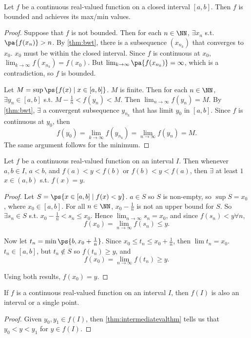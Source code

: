 \documentclass[11pt]{scrartcl}
\numberwithin{equation}{section}
\begin{document}
\begin{theorem}
    Let $f$ be a continuous real-valued function on a closed interval 
    $[a,b]$. Then $f$ is bounded and achieves its max/min values.
\end{theorem}
\begin{proof}
    Suppose that $f$ is not bounded. Then for each $n\in \NN$, 
    $\exists x_n$ s.t. $\pa{f(x_n)}>n$. By \cref{thm:bwt},
    there is a subsequence $(x_{n_k})$ that converges to $x_0$.
    $x_0$ must be within the closed interval. Since $f$ is continuous at 
    $x_0$, $\lim_{k\rightarrow \infty}f(x_{n_k}) =f(x_0)$.
    But $\lim_{k\rightarrow \infty}\pa{f(x_{n_k})} = \infty$,
    which is a contradiction, so $f$ is bounded.
    
    Let $M = \sup\ps{f(x)\mid x\in[a,b]}$. $M$ is finite.
    Then for each $n\in \NN$, $\exists y_n\in[a,b]$ s.t. $M-\frac{1}{n}<f(y_n) < M$. Then $\lim_{n\rightarrow \infty}f(y_n) = M$.
    By \cref{thm:bwt}, $\exists$ a convergent subsequence $y_{n_k}$
    that has limit $y_0$ in $[a,b]$. 
    Since $f$ is continuous at $y_0$, then 
    \[ f(y_0) = \lim_{k\rightarrow \infty}f(y_{n_k}) = \lim_{n\rightarrow \infty}f(y_n) = M. \]
    The same argument follows for the minimum.
\end{proof}
\begin{theorem}
    \label{thm:intermediatevalthm}
    Let $f$ be a continuous real-valued function on an interval $I$.
    Then whenever $a,b\in I$, $a<b$, and $f(a) < y < f(b)$ or 
    $f(b) < y < f(a)$, then $\exists$ at least $1$ $x\in(a,b)$ s.t.
    $f(x) = y$.
\end{theorem}
\begin{proof}
    Let $S = \ps{x\in [a,b] \mid f(x)<y}$.
    $a\in S$ so $S$ is non-empty, so $\sup S = x_0$, where $x_0 \in [a,b]$.
    For all $n\in \NN$, $x_0-\frac{1}{n}$ is not an upper bound for $S$.
    So $\exists s_n\in S$ s.t. $x_0-\frac{1}{n}<s_n\leq x_0$. Hence 
    $\lim_{n\rightarrow \infty}s_n=x_0$, and since $f(s_n)<y \forall n$,
    \[ f(x_0) = \lim_{n\rightarrow \infty}f(s_n)\leq y.\] 

    Now let $t_n = \min\ps{b, x_0+\frac{1}{n}}$. 
    Since $x_0\leq t_n\leq x_0+\frac{1}{n}$, then 
    $\lim t_n = x_0$.
    $t_n\in[a,b]$, but $t_n\notin S$ so $f(t_n)\geq y$, and 
    \[ f(x_0) = \lim_{n\rightarrow \infty}f(t_n)\geq y.\]

    Using both results, $f(x_0) = y$.
\end{proof}
\begin{corollary}
    If $f$ is a continuous real-valued function on an interval $I$, 
    then $f(I)$ is also an interval or a single point.
\end{corollary}
\begin{proof}
    Given $y_0,y_1\in f(I)$, then \cref{thm:intermediatevalthm} tells us 
    that $y_0<y<y_1$ for $y \in f(I)$.
\end{proof}
\clearpage
\end{document}
